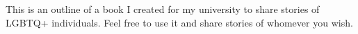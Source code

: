 This is an outline of a book I created for my university to share stories of 
LGBTQ+ individuals. Feel free to use it and share stories of whomever you wish.
